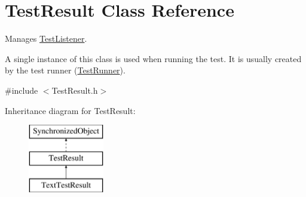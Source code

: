 \hypertarget{class_test_result}{}\section{Test\+Result Class Reference}
\label{class_test_result}


Manages \hyperlink{class_test_listener}{Test\+Listener}.

A single instance of this class is used when running the test. It is usually created by the test runner (\hyperlink{class_test_runner}{Test\+Runner}).  




{\ttfamily \#include $<$Test\+Result.\+h$>$}

Inheritance diagram for Test\+Result\+:\begin{figure}[H]
\begin{center}
\leavevmode
\includegraphics[height=3.000000cm]{class_test_result}
\end{center}
\end{figure}
